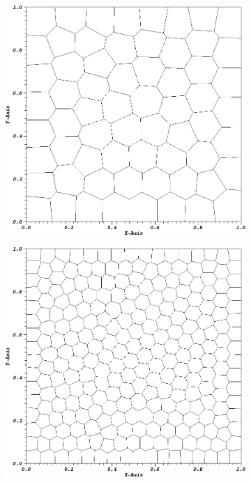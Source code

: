 \begin{figure}
{\begin{subfigure}[b]{0.45\textwidth}
	\end{subfigure}
}
\vspace{2.5mm}
{
	\begin{subfigure}[b]{0.45\textwidth}
		\centering
		\label{subfig::SineMMS_SqPolyMeshn64}
		\includegraphics[width=\textwidth]{figures/sec_BF/SineSqPolyMesh_n64.png}
	\end{subfigure}
	\hfill
	\begin{subfigure}[b]{0.45\textwidth}
		\centering
		\label{subfig::SineMMS_SqPolyMeshn256}
		\includegraphics[width=\textwidth]{figures/sec_BF/SineSqPolyMesh_n256.png}

\end{subfigure}}
\end{figure}

